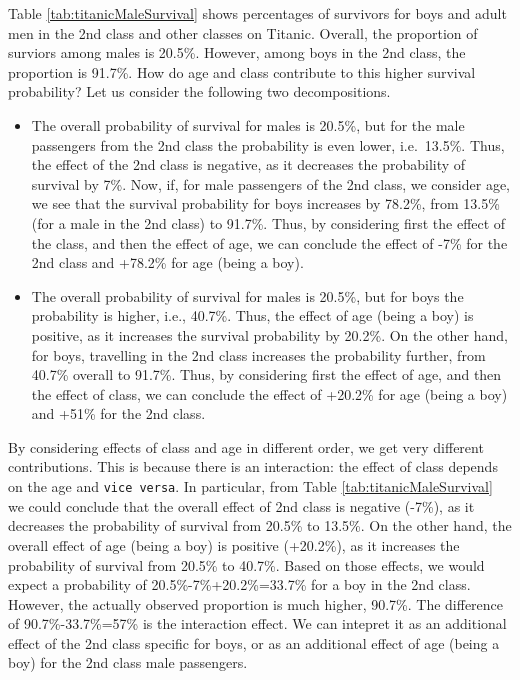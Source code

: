 \documentclass[12pt,]{krantz}
\providecommand{\tightlist}{%
  \setlength{\itemsep}{0pt}\setlength{\parskip}{0pt}}
\begin{document}
Table \ref{tab:titanicMaleSurvival} shows percentages of survivors for boys and adult men in the 2nd class and other classes on Titanic. Overall, the proportion of surviors among males is 20.5\%. However, among boys in the 2nd class, the proportion is 91.7\%. How do age and class contribute to this higher survival probability? Let us consider the following two decompositions.

\begin{itemize}
\tightlist
\item
  The overall probability of survival for males is 20.5\%, but for the male passengers from the 2nd class the probability is even lower, i.e.~13.5\%. Thus, the effect of the 2nd class is negative, as it decreases the probability of survival by 7\%. Now, if, for male passengers of the 2nd class, we consider age, we see that the survival probability for boys increases by 78.2\%, from 13.5\% (for a male in the 2nd class) to 91.7\%. Thus, by considering first the effect of the class, and then the effect of age, we can conclude the effect of -7\% for the 2nd class and +78.2\% for age (being a boy).
\item
  The overall probability of survival for males is 20.5\%, but for boys the probability is higher, i.e., 40.7\%. Thus, the effect of age (being a boy) is positive, as it increases the survival probability by 20.2\%. On the other hand, for boys, travelling in the 2nd class increases the probability further, from 40.7\% overall to 91.7\%. Thus, by considering first the effect of age, and then the effect of class, we can conclude the effect of +20.2\% for age (being a boy) and +51\% for the 2nd class.
\end{itemize}

By considering effects of class and age in different order, we get very different contributions. This is because there is an interaction: the effect of class depends on the age and \texttt{vice\ versa}. In particular, from Table \ref{tab:titanicMaleSurvival} we could conclude that the overall effect of 2nd class is negative (-7\%), as it decreases the probability of survival from 20.5\% to 13.5\%. On the other hand, the overall effect of age (being a boy) is positive (+20.2\%), as it increases the probability of survival from 20.5\% to 40.7\%. Based on those effects, we would expect a probability of 20.5\%-7\%+20.2\%=33.7\% for a boy in the 2nd class. However, the actually observed proportion is much higher, 90.7\%. The difference of 90.7\%-33.7\%=57\% is the interaction effect. We can intepret it as an additional effect of the 2nd class specific for boys, or as an additional effect of age (being a boy) for the 2nd class male passengers.
\end{document}
